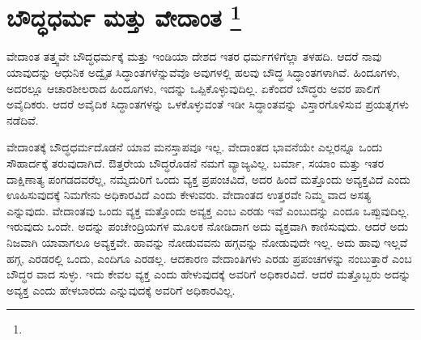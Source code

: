 
\vspace{-0.6cm}

\chapter[ಬೌದ್ಧಧರ್ಮ ಮತ್ತು ವೇದಾಂತ ]{ಬೌದ್ಧಧರ್ಮ ಮತ್ತು ವೇದಾಂತ \protect\footnote{}}

ವೇದಾಂತ ತತ್ತ್ವವೇ ಬೌದ್ಧಧರ್ಮಕ್ಕೆ ಮತ್ತು ಇಂಡಿಯಾ ದೇಶದ ಇತರ ಧರ್ಮಗಳಿಗೆಲ್ಲಾ ತಳಹದಿ. ಆದರೆ ನಾವು ಯಾವುದನ್ನು ಆಧುನಿಕ ಅದ್ವೈತ ಸಿದ್ಧಾಂತಗಳೆನ್ನುವೆವೊ ಅವುಗಳಲ್ಲಿ ಹಲವು ಬೌದ್ಧ ಸಿದ್ಧಾಂತಗಳಾಗಿವೆ. ಹಿಂದೂಗಳು, ಅದರಲ್ಲೂ ಆಚಾರಶೀಲರಾದ ಹಿಂದೂಗಳು, ಇದನ್ನು ಒಪ್ಪಿಕೊಳ್ಳುವುದಿಲ್ಲ. ಏಕೆಂದರೆ ಬೌದ್ಧರು ಅವರ ಪಾಲಿಗೆ ಅವೈದಿಕರು. ಆದರೆ ಅವೈದಿಕ ಸಿದ್ಧಾಂತಗಳನ್ನು ಒಳಕೊಳ್ಳುವಂತೆ ಇಡೀ ಸಿದ್ಧಾಂತವನ್ನು ವಿಸ್ತಾರಗೊಳಿಸುವ ಪ್ರಯತ್ನಗಳು ನಡೆದಿವೆ.

ವೇದಾಂತಕ್ಕೆ ಬೌದ್ಧಧರ್ಮದೊಡನೆ ಯಾವ ಮನಸ್ತಾಪವೂ ಇಲ್ಲ. ವೇದಾಂತದ ಭಾವನೆಯೇ ಎಲ್ಲರನ್ನೂ ಒಂದು ಸೌಹಾರ್ದಕ್ಕೆ ತರುವುದಾಗಿದೆ. ಔತ್ತರೇಯ ಬೌದ್ಧರೊಡನೆ ನಮಗೆ ವ್ಯಾಜ್ಯವಿಲ್ಲ. ಬರ್ಮಾ, ಸಯಾಂ ಮತ್ತು ಇತರ ದಾಕ್ಷಿಣಾತ್ಯ ಪಂಗಡದವರೆಲ್ಲ, ನಮ್ಮೆದುರಿಗೆ ಒಂದು ವ್ಯಕ್ತ ಪ್ರಪಂಚವಿದೆ, ಅದರ ಹಿಂದೆ ಮತ್ತೊಂದು ಅವ್ಯಕ್ತವಿದೆ ಎಂದು ಊಹಿಸುವುದಕ್ಕೆ ನಿಮಗೇನು ಅಧಿಕಾರವಿದೆ ಎಂದು ಕೇಳುವರು. ವೇದಾಂತದ ಉತ್ತರವೇ ನಿಮ್ಮ ವಾದ ಅಸತ್ಯ ಎನ್ನುವುದು. ವೇದಾಂತವು ಒಂದು ವ್ಯಕ್ತ ಮತ್ತೊಂದು ಅವ್ಯಕ್ತ ಎಂಬ ಎರಡು ಇವೆ ಎಂಬುದನ್ನು ಎಂದೂ ಒಪ್ಪುವುದಿಲ್ಲ. ಇರುವುದು ಒಂದೇ. ಅದನ್ನು ಪಂಚೇಂದ್ರಿಯಗಳ ಮೂಲಕ ನೋಡಿದಾಗ ಅದು ವ್ಯಕ್ತವಾಗಿ ಕಾಣಿಸುವುದು. ಆದರೆ ಅದು ನಿಜವಾಗಿ ಯಾವಾಗಲೂ ಅವ್ಯಕ್ತವೇ. ಹಾವನ್ನು ನೋಡುವವನು ಹಗ್ಗವನ್ನು ನೋಡುವುದೇ ಇಲ್ಲ. ಅದು ಹಾವು ಇಲ್ಲವೆ ಹಗ್ಗ, ಎರಡರಲ್ಲಿ ಒಂದು, ಎಂದಿಗೂ ಎರಡಲ್ಲ. ಆದಕಾರಣ ವೇದಾಂತಿಗಳು ಎರಡು ಪ್ರಪಂಚಗಳನ್ನು ನಂಬುತ್ತಾರೆ ಎಂಬ ಬೌದ್ಧರ ವಾದ ಸುಳ್ಳು. ಇದು ಕೇವಲ ವ್ಯಕ್ತ ಎಂದು ಹೇಳುವುದಕ್ಕೆ ಅವರಿಗೆ ಅಧಿಕಾರವಿದೆ. ಆದರೆ ಮತ್ತೊಬ್ಬರು ಅದನ್ನು ಅವ್ಯಕ್ತ ಎಂದು ಹೇಳಬಾರದು ಎನ್ನುವುದಕ್ಕೆ ಅವರಿಗೆ ಅಧಿಕಾರವಿಲ್ಲ.

